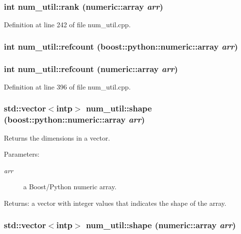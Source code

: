 \subsubsection{\setlength{\rightskip}{0pt plus 5cm}int num\_\-util::rank (numeric::array {\em arr})}\label{namespacenum__util_a38}




Definition at line 242 of file num\_\-util.cpp.
\subsubsection{\setlength{\rightskip}{0pt plus 5cm}int num\_\-util::refcount (boost::python::numeric::array {\em arr})}\label{namespacenum__util_a73}


\subsubsection{\setlength{\rightskip}{0pt plus 5cm}int num\_\-util::refcount (numeric::array {\em arr})}\label{namespacenum__util_a53}




Definition at line 396 of file num\_\-util.cpp.
\subsubsection{\setlength{\rightskip}{0pt plus 5cm}std::vector$<$intp$>$ num\_\-util::shape (boost::python::numeric::array {\em arr})}\label{namespacenum__util_a68}


Returns the dimensions in a vector. \begin{Desc}
\item[Parameters:]
\begin{description}
\item[{\em arr}]a Boost/Python numeric array. \end{description}
\end{Desc}
\begin{Desc}
\item[Returns:]a vector with integer values that indicates the shape of the array.\end{Desc}
\subsubsection{\setlength{\rightskip}{0pt plus 5cm}std::vector$<$intp$>$ num\_\-util::shape (numeric::array {\em arr})}\label{namespacenum__util_a42}




